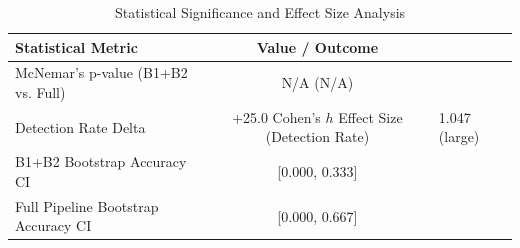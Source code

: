 \begin{table}[h]
\centering
\caption{Statistical Significance and Effect Size Analysis}
\label{tab:semantic_stats}
\begin{tabular}{lc}
\hline
\textbf{Statistical Metric} & \textbf{Value / Outcome} \\ \hline
McNemar's p-value (B1+B2 vs. Full) & N/A (N/A) \\
Detection Rate Delta & +25.0%
Cohen's $h$ Effect Size (Detection Rate) & 1.047 (large) \\
B1+B2 Bootstrap Accuracy CI & [0.000, 0.333] \\
Full Pipeline Bootstrap Accuracy CI & [0.000, 0.667] \\
\hline
\end{tabular}
\end{table}

